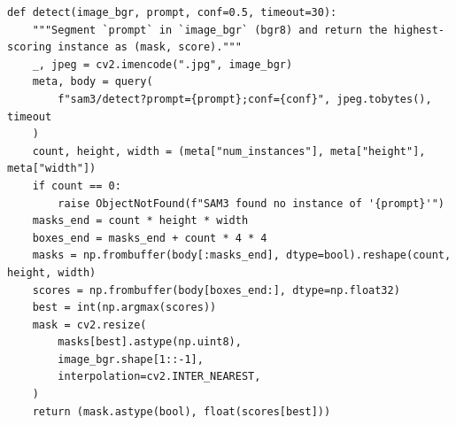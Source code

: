 \documentclass[11pt,a4paper]{book}
\begin{document}
\begin{lstlisting}[firstnumber=12]
def detect(image_bgr, prompt, conf=0.5, timeout=30):
    """Segment `prompt` in `image_bgr` (bgr8) and return the highest-scoring instance as (mask, score)."""
    _, jpeg = cv2.imencode(".jpg", image_bgr)
    meta, body = query(
        f"sam3/detect?prompt={prompt};conf={conf}", jpeg.tobytes(), timeout
    )
    count, height, width = (meta["num_instances"], meta["height"], meta["width"])
    if count == 0:
        raise ObjectNotFound(f"SAM3 found no instance of '{prompt}'")
    masks_end = count * height * width
    boxes_end = masks_end + count * 4 * 4
    masks = np.frombuffer(body[:masks_end], dtype=bool).reshape(count, height, width)
    scores = np.frombuffer(body[boxes_end:], dtype=np.float32)
    best = int(np.argmax(scores))
    mask = cv2.resize(
        masks[best].astype(np.uint8),
        image_bgr.shape[1::-1],
        interpolation=cv2.INTER_NEAREST,
    )
    return (mask.astype(bool), float(scores[best]))
\end{lstlisting}
\end{document}
